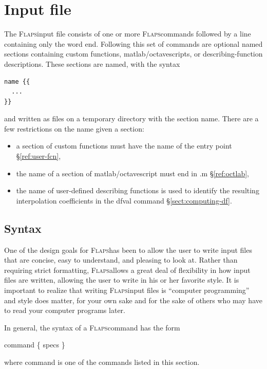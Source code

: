 \documentclass[11pt,openany,twoside]{book}
\numberwithin{equation}{section}		%
\newcommand{\Cmd}[1]{{\sf #1}}
\newcommand{\Subst}[1]{{\small\sf #1}}
\newcommand{\Flaps}{\textsc{Flaps\:}}
\newcommand{\Octlab}{\Cmd{matlab}/\Cmd{octave}\:}
\newcommand{\Sectref}[1]{\S\ref{#1}}
\begin{document}
\section{Input file}\label{sect:input-file}
The \Flaps input file consists of one or more \Flaps commands followed by a
line containing only the word \Cmd{end}. Following this set of commands are
optional named sections 
containing custom functions,
 \Octlab scripts,\index{matlab@\Octlab!scripts}
or describing-function descriptions. These sections are named, with the syntax
\begin{lstlisting}
name {{
  ...
}}
\end{lstlisting}
and written as files on a temporary directory with the section name.
There are a few restrictions on the name given a section:
\begin{itemize}
\item a section of custom functions must have the name of the entry point
	\Sectref{ref:user-fcn},
\item the name of a section of \Octlab script must end in .m
	\Sectref{ref:octlab},
\item the name of user-defined describing functions is used to identify the
       resulting interpolation coefficients in the \Cmd{dfval} command
		 \Sectref{sect:computing-df}.
\end{itemize}

\subsection{Syntax}\label{sect:syntax}
One of the design goals for \Flaps has been to allow the user
to write input files that are concise, easy to understand, and pleasing to look at.
Rather than requiring strict formatting, \Flaps allows a great
deal of flexibility in how input files are written, allowing
the user to write in his or her favorite style.
It is important to realize that writing \Flaps input files is
``computer programming'' and style does matter, for your
own sake and for the sake of others who may have to read your
computer programs later.
\par
In general, the syntax of a \Flaps command has the form
\par
\hspace{0.5in} \Cmd{command} \{ \Subst{specs\/} \} 
\par
where \Cmd{command} is one of the commands listed in this section.
\end{document}
